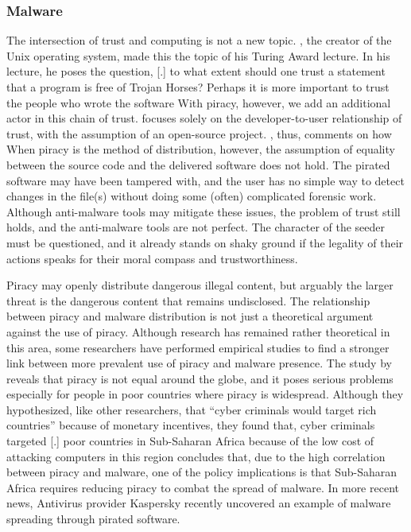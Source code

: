 \documentclass[onecolumn, 12pt]{article}
\begin{document}
\begin{refsection}
\subsubsection{Malware}
The intersection of trust and computing is not a new topic.
\citeauthor{thompson:trust}, the creator of the Unix operating system, made this
the topic of his Turing Award lecture. In his lecture, he poses the question,
[.]{%
  to what extent should one trust a statement that
  a program is free of Trojan Horses? Perhaps it is more important to trust the
  people who wrote the software%
} With piracy, however, we add an additional actor in this chain of trust.
\citeauthor{thompson:trust} focuses solely on the developer-to-user relationship
of trust, with the assumption of an open-source project.
\citeauthor{thompson:trust}, thus, comments on how
 When piracy is the method of distribution, however, the assumption of
equality between the source code and the delivered software does not hold. The
pirated software may have been tampered with, and the user has no simple way to
detect changes in the file(s) without doing some (often) complicated forensic
work. Although anti-malware tools may mitigate these issues, the problem of
trust still holds, and the anti-malware tools are not perfect. The character of
the seeder must be questioned, and it already stands on shaky ground if the
legality of their actions speaks for their moral compass and trustworthiness.

Piracy may openly distribute dangerous illegal content, but arguably the
larger threat is the dangerous content that remains undisclosed.
The relationship between piracy and malware distribution is not just a
theoretical argument against the use of piracy. Although research has remained
rather theoretical in this area, some researchers have performed empirical
studies to find a stronger link between more prevalent use of piracy and
malware presence. The study by \citeauthor{mezzour:empirical-study} reveals that
piracy is not equal around the globe, and it poses serious problems especially
for people in poor countries where piracy is widespread. Although they
hypothesized, like other researchers, that \enquote{cyber criminals would target
rich countries} because of monetary incentives, they found that, cyber criminals
targeted [.]{%
  poor countries in Sub-Saharan Africa because of the low cost of attacking
  computers in this region%
} \citeauthor{mezzour:empirical-study} concludes that, due to the high
correlation between piracy and malware, one of the policy implications is that
Sub-Saharan Africa requires reducing piracy to combat the spread of malware.
In more recent news, Antivirus provider Kaspersky recently uncovered an example
of malware spreading through pirated software.~\cite{pcmag:malware}


\end{refsection}
\end{document}
